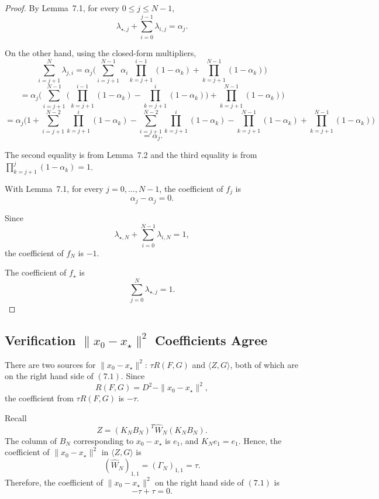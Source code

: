 {\begin{proof}
By Lemma~7.1, for every $0\le j\le N-1$,
\[\lambda_{\star,j}+\sum_{i=0}^{j-1}\lambda_{i,j}=\alpha_j.\]

On the other hand, using the closed-form multipliers,
\[\sum_{i=j+1}^{N}\lambda_{j,i}=\alpha_j
\Big(\sum_{i=j+1}^{N-1}\alpha_i\prod_{k=j+1}^{i-1}(1-\alpha_k)+\prod_{k=j+1}^{N-1}(1-\alpha_k)\Big)\]
\[=\alpha_j\Big(\sum_{i=j+1}^{N-1}
\Big(\prod_{k=j+1}^{i-1}(1-\alpha_k)-\prod_{k=j+1}^{i}(1-\alpha_k)\Big)+\prod_{k=j+1}^{N-1}(1-\alpha_k)\Big)\]
\[=\alpha_j\Big(1+\sum_{i=j+1}^{N-2}\prod_{k=j+1}^{i}(1-\alpha_k)-\sum_{i=j+1}^{N-2}
\prod_{k=j+1}^{i}(1-\alpha_k)-\prod_{k=j+1}^{N-1}(1-\alpha_k)+\prod_{k=j+1}^{N-1}(1-\alpha_k)\Big)\]
\[=\alpha_j.\]

The second equality is from Lemma~7.2 and the third equality is from
$\prod_{k=j+1}^{j}(1-\alpha_k)=1$.

With Lemma~7.1, for every $j=0,\ldots,N-1$, the coefficient of $f_j$ is
\[\alpha_j-\alpha_j=0.\]

Since
\[\lambda_{\star,N}+\sum_{i=0}^{N-1}\lambda_{i,N}=1,\]
the coefficient of $f_N$ is $-1$.

The coefficient of $f_\star$ is
\[\sum_{j=0}^{N}\lambda_{\star,j}=1.\]
\end{proof}



\subsection{Verification $\|x_0-x_\star\|^2$ Coefficients Agree}
There are two sources for $\|x_0-x_\star\|^2$: $\tau R(F,G)$ and $\langle Z,G\rangle$, both of which are on the right hand side of $(7.1)$.
Since
\[R(F,G)=D^2-\|x_0-x_\star\|^2,\]
the coefficient from $\tau R(F,G)$ is $-\tau$.

Recall
\[Z=(K_NB_N)^T\widehat{W}_N(K_NB_N).\]
The column of $B_N$ corresponding to $x_0-x_\star$ is $e_1$, and $K_Ne_1=e_1$.
Hence, the coefficient of $\|x_0-x_\star\|^2$ in $\langle Z,G\rangle$ is
\[(\widehat{W}_N)_{1,1}=(\Gamma_N)_{1,1}=\tau.\]
Therefore, the coefficient of $\|x_0-x_\star\|^2$ on the right hand side of $(7.1)$ is
\[-\tau+\tau=0.\]



}

